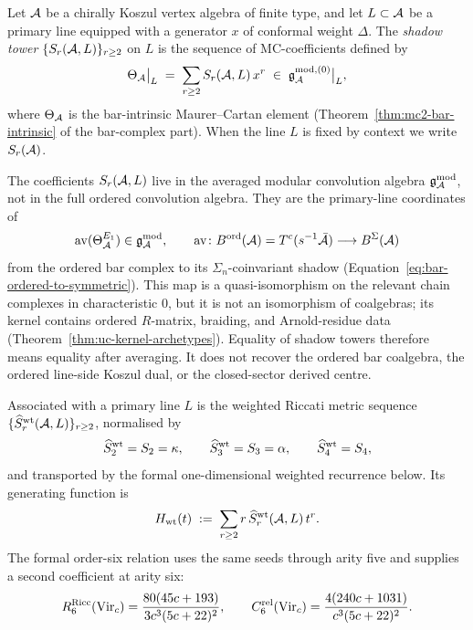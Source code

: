 \begin{definition}
\label{def:shadow-tower-primary-line}
Let $\mathcal{A}$ be a chirally Koszul vertex algebra of finite type, and let
$L \subset \mathcal{A}$ be a primary line equipped with a generator $x$ of
conformal weight $\Delta$. The
\emph{shadow tower} $\{S_r(\mathcal{A}, L)\}_{r\ge 2}$ on $L$ is the sequence
of MC-coefficients defined by
\[
\Theta_{\mathcal{A}}\big|_{L} \;=\; \sum_{r\ge 2} S_r(\mathcal{A}, L)\,x^{r}
\;\in\; \mathfrak g^{\rm mod, (0)}_{\mathcal{A}}\big|_{L},
\]
where $\Theta_{\mathcal{A}}$ is the bar-intrinsic Maurer--Cartan element
(Theorem~\ref{thm:mc2-bar-intrinsic} of the bar-complex part). When
the line $L$ is fixed by context we write $S_r(\mathcal{A})$.
\end{definition}

\begin{remark}
\label{rem:averaged-shadow-information-loss}
The coefficients $S_r(\mathcal{A},L)$ live in the averaged modular
convolution algebra
$\mathfrak g^{\rm mod}_{\mathcal{A}}$, not in the full ordered convolution
algebra. They are the primary-line coordinates of
\[
\operatorname{av}(\Theta_{\mathcal{A}}^{E_1})
\in \mathfrak g^{\rm mod}_{\mathcal{A}},
\qquad
\operatorname{av}\colon
B^{\mathrm{ord}}(\mathcal{A})=T^c(s^{-1}\bar{\mathcal{A}})
\longrightarrow
B^\Sigma(\mathcal{A})
\]
from the ordered bar complex to its $\Sigma_n$-coinvariant shadow
(Equation~\ref{eq:bar-ordered-to-symmetric}). This map is a
quasi-isomorphism on the relevant chain complexes in characteristic
$0$, but it is not an isomorphism of coalgebras; its kernel contains
ordered $R$-matrix, braiding, and Arnold-residue data
(Theorem~\ref{thm:uc-kernel-archetypes}). Equality of shadow towers
therefore means equality after averaging. It does not recover the
ordered bar coalgebra, the ordered line-side Koszul dual, or the
closed-sector derived centre.
\end{remark}

\begin{definition}
\label{def:weighted-riccati-metric}
Associated with a primary line $L$ is the weighted Riccati metric
sequence $\{\widehat S^{\rm wt}_r(\mathcal{A},L)\}_{r\ge2}$, normalised by
\[
\widehat S^{\rm wt}_2=S_2=\kappa,\qquad
\widehat S^{\rm wt}_3=S_3=\alpha,\qquad
\widehat S^{\rm wt}_4=S_4,
\]
and transported by the formal one-dimensional weighted recurrence below.
Its generating function is
\[
H_{\rm wt}(t) \;:=\; \sum_{r\ge2} r\,\widehat S^{\rm wt}_r(\mathcal{A},L)\,t^r.
\]
The formal order-six relation uses the same seeds through arity five
and supplies a second coefficient at arity six:
\[
R^{\mathrm{Ricc}}_6(\mathrm{Vir}_c)
=\frac{80(45c+193)}{3c^3(5c+22)^2},
\qquad
C^{\mathrm{rel}}_6(\mathrm{Vir}_c)
=\frac{4(240c+1031)}{c^3(5c+22)^2}.
\]
\end{definition}

